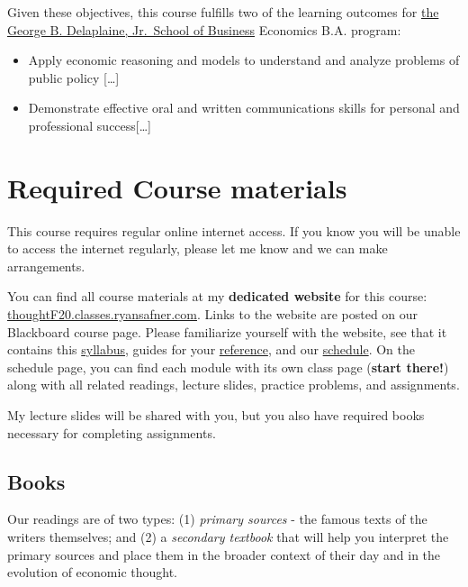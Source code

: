 \documentclass{article}
\providecommand{\tightlist}{%
  \setlength{\itemsep}{0pt}\setlength{\parskip}{0pt}}
\begin{document}
Given these objectives, this course fulfills two of the learning
outcomes for
\href{https://www.hood.edu/academics/departments/george-b-delaplaine-jr-school-business/student-learning-outcomes}{the
George B. Delaplaine, Jr.~School of Business} Economics B.A. program:

\begin{itemize}
\tightlist
\item
  Apply economic reasoning and models to understand and analyze problems
  of public policy {[}\ldots{]}
\item
  Demonstrate effective oral and written communications skills for
  personal and professional success{[}\ldots{]}
\end{itemize}

\hypertarget{required-course-materials}{%
\section*{Required Course materials}\label{required-course-materials}}

This course requires regular online internet access. If you know you
will be unable to access the internet regularly, please let me know and
we can make arrangements.

You can find all course materials at my \textbf{dedicated website} for
this course:
\href{https://thoughtF20.classes.ryansafner.com}{thoughtF20.classes.ryansafner.com}.
Links to the website are posted on our Blackboard course page. Please
familiarize yourself with the website, see that it contains this
\href{https://thoughtF20.classes.ryansafner.com/syllabus/}{syllabus},
guides for your
\href{https://thoughtF20.classes.ryansafner.com/reference/}{reference},
and our
\href{https://thoughtF20.classes.ryansafner.com/schedule/}{schedule}. On
the schedule page, you can find each module with its own class page
(\textbf{start there!}) along with all related readings, lecture slides,
practice problems, and assignments.

My lecture slides will be shared with you, but you also have required
books necessary for completing assignments.

\hypertarget{books}{%
\subsection*{Books}\label{books}}

Our readings are of two types: (1) \emph{primary sources} - the famous
texts of the writers themselves; and (2) a \emph{secondary textbook}
that will help you interpret the primary sources and place them in the
broader context of their day and in the evolution of economic thought.
\end{document}
